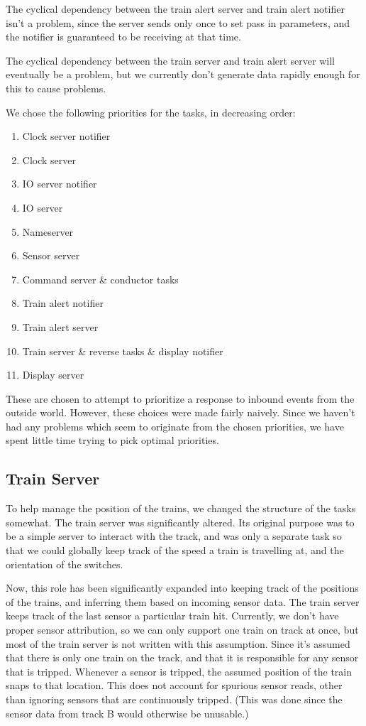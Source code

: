 \documentclass[titlepage]{article}
\begin{document}
The cyclical dependency between the train alert server and train alert notifier
isn't a problem, since the server sends only once to set pass in parameters, and
the notifier is guaranteed to be receiving at that time.

The cyclical dependency between the train server and train alert server will
eventually be a problem, but we currently don't generate data rapidly enough for
this to cause problems.

We chose the following priorities for the tasks, in decreasing order:

\begin{enumerate}
\item Clock server notifier
\item Clock server
\item IO server notifier
\item IO server
\item Nameserver
\item Sensor server
\item Command server \& conductor tasks
\item Train alert notifier
\item Train alert server
\item Train server \& reverse tasks \& display notifier
\item Display server
\end{enumerate}

These are chosen to attempt to prioritize a response to inbound events from
the outside world.
However, these choices were made fairly naively.
Since we haven't had any problems which seem to originate from the chosen
priorities, we have spent little time trying to pick optimal priorities.

\subsection{Train Server}
To help manage the position of the trains, we changed the structure of the
tasks somewhat.
The train server was significantly altered.
Its original purpose was to be a simple server to interact with the track,
and was only a separate task so that we could globally keep track of the
speed a train is travelling at, and the orientation of the switches.

Now, this role has been significantly expanded into keeping track of the
positions of the trains, and inferring them based on incoming sensor data.
The train server keeps track of the last sensor a particular train hit.
Currently, we don't have proper sensor attribution, so we can only support
one train on track at once, but most of the train server is not written with
this assumption.
Since it's assumed that there is only one train on the track, and that
it is responsible for any sensor that is tripped.
Whenever a sensor is tripped, the assumed position of the train snaps to that
location.
This does not account for spurious sensor reads, other than ignoring
sensors that are continuously tripped.
(This was done since the sensor data from track B would otherwise be unusable.)
\end{document}
